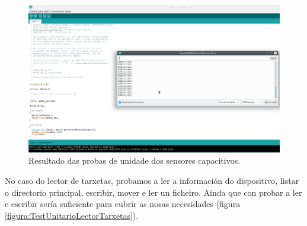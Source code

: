   \begin{figure}[htbp]
   \centering
   \includegraphics[scale=0.5,angle=90,keepaspectratio=true]{./imagenes/resultado-test-sensores-capacitivos.png}
   \caption{Resultado das probas de unidade dos sensores capacitivos.}
   \label{figura:ResultadoTestUnitarioSensoresCapacitivos}
  \end{figure}
  
  No caso do lector de tarxetas, probamos a ler a información do dispositivo,
  listar o directorio principal, escribir, mover e ler un ficheiro. Aínda que
  con probar a ler e escribir sería suficiente para cubrir as nosas necesidades
  (figura \ref{figura:TestUnitarioLectorTarxetas}). \\
  
